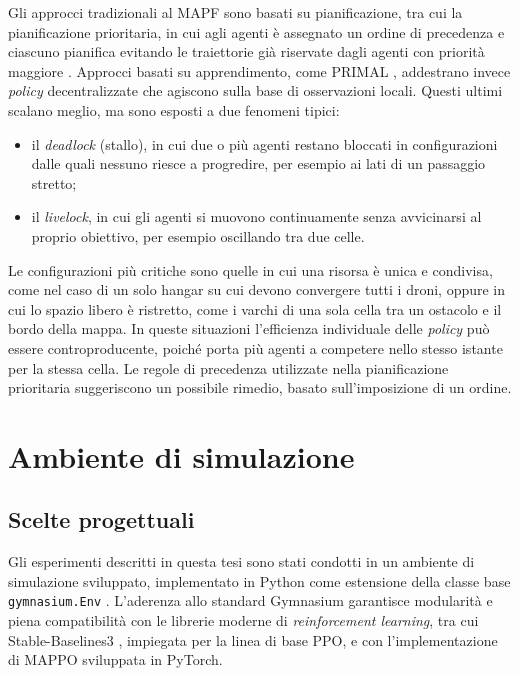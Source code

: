 \documentclass[12pt,a4paper,twoside]{report}
\newcommand{\parencite}[1]{\citep{#1}}
\begin{document}
Gli approcci tradizionali al MAPF sono basati su pianificazione, tra cui la pianificazione prioritaria, in cui agli agenti è assegnato un ordine di precedenza e ciascuno pianifica evitando le traiettorie già riservate dagli agenti con priorità maggiore \parencite{silver2005}. Approcci basati su apprendimento, come PRIMAL \parencite{sartoretti2019}, addestrano invece \emph{policy} decentralizzate che agiscono sulla base di osservazioni locali. 
\newpage
Questi ultimi scalano meglio, ma sono esposti a due fenomeni tipici:
\begin{itemize}
    \item il \emph{deadlock} (stallo), in cui due o più agenti restano bloccati in configurazioni dalle quali nessuno riesce a progredire, per esempio ai lati di un passaggio stretto;
    \item il \emph{livelock}, in cui gli agenti si muovono continuamente senza avvicinarsi al proprio obiettivo, per esempio oscillando tra due celle.
\end{itemize}

Le configurazioni più critiche sono quelle in cui una risorsa è unica e condivisa, come nel caso di un solo hangar su cui devono convergere tutti i droni, oppure in cui lo spazio libero è ristretto, come i varchi di una sola cella tra un ostacolo e il bordo della mappa. In queste situazioni l'efficienza individuale delle \emph{policy} può essere controproducente, poiché porta più agenti a competere nello stesso istante per la stessa cella. Le regole di precedenza utilizzate nella pianificazione prioritaria suggeriscono un possibile rimedio, basato sull'imposizione di un ordine.

\chapter{Ambiente di simulazione}
\label{chap:ambiente}

\section{Scelte progettuali}
\label{sec:scelte_progettuali}

Gli esperimenti descritti in questa tesi sono stati condotti in un ambiente di simulazione sviluppato, implementato in Python come estensione della classe base \texttt{gymnasium.Env} \parencite{towers2024}. L'aderenza allo standard Gymnasium garantisce modularità e piena compatibilità con le librerie moderne di \emph{reinforcement learning}, tra cui Stable-Baselines3 \parencite{raffin2021}, impiegata per la linea di base PPO, e con l'implementazione di MAPPO sviluppata in PyTorch.
\end{document}
